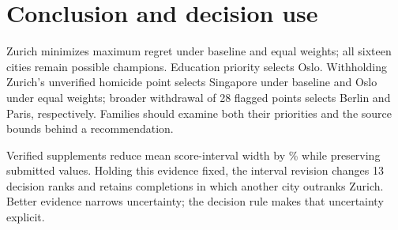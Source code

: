 \section{Conclusion and decision use}
Zurich minimizes maximum regret under baseline and equal weights; all sixteen
cities remain possible champions. Education priority selects Oslo. Withholding
Zurich's unverified homicide point selects Singapore under baseline and Oslo
under equal weights; broader withdrawal of 28 flagged points selects Berlin and
Paris, respectively. Families should examine both their priorities and the
source bounds behind a recommendation.

Verified supplements reduce mean score-interval width by \TotalWidthReduction\% while preserving
submitted values. Holding this evidence fixed, the interval revision changes
13 decision ranks and retains completions in which another city outranks Zurich.
Better evidence narrows uncertainty; the decision rule makes that uncertainty
explicit.
